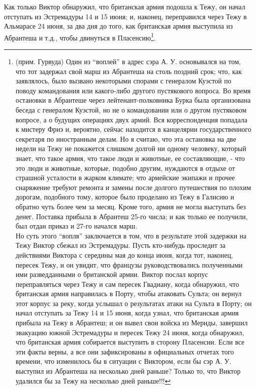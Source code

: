 \documentclass[
  oneside,
  12pt,
  titlepage]{book}
\begin{document}
Как только Виктор обнаружил, что британская армия подошла к Тежу, он начал отступать из Эстремадуры 14 и 15 июня; и, наконец, переправился через Тежу в Альмарасе 24 июня, за два дня до того, как британская армия выступила из Абрантеша и т.д., чтобы двинуться в Пласенсию\footnote{(прим. Гурвуда) Один из ``воплей'' в адрес сэра А. У. основывался на том, что тот задержал свой марш из Абрантеша на столь поздний срок; что, как заявлялось, было вызвано некоторыми спорами с генералом Куэстой по поводу командования или какого-либо другого пустякового вопроса. Во время остановки в Абрантеше через лейтенант-полковника Бурка была организована беседа с генералом Куэстой, но не о командовании или о другом пустяковом вопросе, а о будущих операциях двух армий. Вся корреспонденция попадала к мистеру Фриэ и, вероятно, сейчас находится в канцелярии государственного секретаря по иностранным делам. Но я считаю, что эта остановка на две недели на Тежу не покажется слишком долгой ни одному человеку, который знает, что такое армия, что такое люди и животные, ее составляющие, - что это люди и животные, которые, подобно другим, нуждаются в отдыхе от страшной усталости в жарком климате; что армейские экипажи и прочее снаряжение требуют ремонта и замены после долгого путешествия по плохим дорогам, подобного тому, которое было проделано из Тежу в Галисию и обратно чуть более чем за месяц. Кроме того, армия не могла выступать без денег. Поставка прибыла в Абрантеш 25-го числа; и как только ее получили, был отдан приказ и 27-го начался марш.\\
  Но суть этого ``вопля'' заключается в том, что в результате этой задержки на Тежу Виктор сбежал из Эстремадуры. Пусть кто-нибудь проследит за действиями Виктора с середины мая до конца июня, когда тот, наконец, пересек Тежу, и он увидит, что французы руководствовались полученными ими разведданными о британской армии. Виктор послал корпус переправляться через Тежу и сам пересек Гвадиану, когда обнаружил, что британская армия направилась в Порту, чтобы атаковать Сульта; он вернул этот корпус за реку, когда услышал о результатах атаки на Сульта в Порту; он начал отступать за Тежу 14 и 15 июня, когда узнал, что британская армия прибыла на Тежу в Абрантеш; и он вывел свои войска из Мериды, завершил эвакуацию южной Эстремадуры и пересек Тежу 24 июня, когда обнаружил, что британская армия собирается выступить в сторону Пласенсии. Если все эти факты верны, а все они зафиксированы в официальных отчетах того времени, что изменилось бы в ситуации с Виктором, если бы сэр А. У. выступил из Абрантеша на несколько дней раньше? Только то, что Виктор удалился бы за Тежу на несколько дней раньше!!!}.
\end{document}
